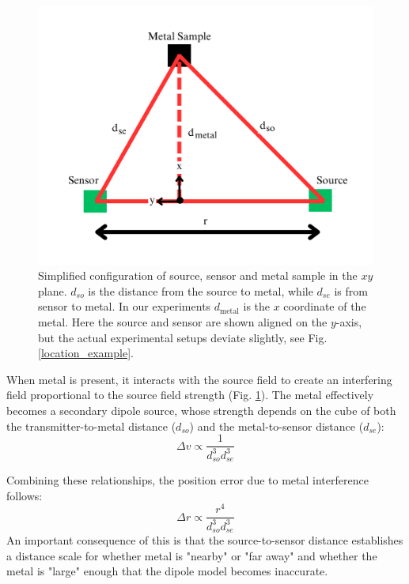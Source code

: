 \documentclass[journal,twoside,web]{ieeecolor}
\begin{document}
\begin{figure}[!htbp]
\centerline{\includegraphics[width=\columnwidth]{chaic2.png}}
\caption{Simplified configuration of source, sensor and metal sample in the $xy$ plane. $d_{so}$ is the distance from the source to metal, while $d_{se}$ is from sensor to metal. In our experiments $d_\mathrm{metal}$ is the $x$ coordinate of the metal. Here the source and sensor are shown aligned on the $y$-axis, but the actual experimental setups deviate slightly, see Fig. \ref{location_example}. 
}
\label{distance_config}
\end{figure}

When metal is present, it interacts with the source field to create an interfering field proportional to the source field strength (Fig. \ref{distance_config}). The metal effectively becomes a secondary dipole source, whose strength depends on the cube of both the transmitter-to-metal distance ($d_{so}$) and the metal-to-sensor distance ($d_{se}$):
\begin{equation}
\Delta v \propto \frac{1}{d_{so}^3 d_{se}^3}
\label{eq:metal_interference}
\end{equation}

Combining these relationships, the position error due to metal interference follows:
\begin{equation}
\Delta r \propto \frac{r^4}{d_{so}^3 d_{se}^3}
\label{eq:combined_error}
\end{equation}
An important consequence of this is that the source-to-sensor distance establishes a distance scale for whether metal is "nearby" or "far away" and whether the metal is "large" enough that the dipole model becomes inaccurate.
\end{document}
